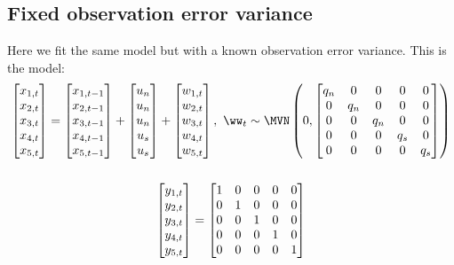 \subsection{Fixed observation error variance}
Here we fit the same model but with a known observation error variance.  This is the model:
\begin{gather*}
\begin{bmatrix}x_{1,t}\\x_{2,t}\\x_{3,t}\\x_{4,t}\\x_{5,t}\end{bmatrix}
= \begin{bmatrix}x_{1,t-1}\\x_{2,t-1}\\x_{3,t-1}\\x_{4,t-1}\\x_{5,t-1}\end{bmatrix}
+ \begin{bmatrix}u_n\\u_n\\u_n\\u_s\\u_s\end{bmatrix}
+ \begin{bmatrix}w_{1,t}\\w_{2,t}\\w_{3,t}\\w_{4,t}\\w_{5,t}\end{bmatrix},
 \textrm{ } \ww_t \sim \MVN\begin{pmatrix} 0,\begin{bmatrix}q_n&0&0&0&0\\0&q_n&0&0&0\\0&0&q_n&0&0\\0&0&0&q_s&0\\0&0&0&0&q_s\end{bmatrix} \end{pmatrix}  \\
\\
\begin{bmatrix}y_{1,t}\\y_{2,t}\\y_{3,t}\\y_{4,t}\\y_{5,t}\end{bmatrix}
= \begin{bmatrix}1&0&0&0&0\\0&1&0&0&0\\0&0&1&0&0\\0&0&0&1&0\\0&0&0&0&1\end{bmatrix}

\end{gather*}
